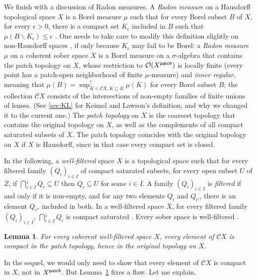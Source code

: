 \documentclass[preprint,12pt]{elsarticle}
\newcommand\diff{\smallsetminus}
\newcommand\Open{{\mathcal O}}
\newcommand\patch{{\text{\textsf{patch}}}}
\newcommand\dsup{\sup\nolimits^{\scriptstyle\uparrow}}
\newcommand\fcap{\bigcap\nolimits^{\scriptstyle\downarrow}}
\newtheorem{lemma}[theorem]{Lemma}
\begin{document}
We finish with a discussion of Radon measures.  A \emph{Radon measure}
on a Hausdorff topological space $X$ is a Borel measure $\mu$ such
that for every Borel subset $B$ of $X$, for every $\epsilon > 0$,
there is a compact set $K_\epsilon$ included in $B$ such that
$\mu (B \diff K_\epsilon) \leq \epsilon$
\cite[Definition~7.1.1]{Bogachev:mes:II}.  One needs to take care to
modify this definition slightly on non-Hausdorff spaces
\cite[Definition~7.2]{KL:measureext}, if only because $K_\epsilon$ may
fail to be Borel: a \emph{Radon measure} $\mu$ on a coherent sober
space $X$ is a Borel measure on a $\sigma$-algebra that contains the
patch topology on $X$, whose restriction to $\Open {(X^\patch)}$ is
locally finite (every point has a patch-open neighborhood of finite
$\mu$-measure) and \emph{inner regular}, meaning that
$\mu (B) = \dsup_{K \in \mathcal C X, K \subseteq B} \mu (K)$ for
every Borel subset $B$; the collection $\mathcal C X$ consists of the
intersections of non-empty families of finite unions of lenses.  (See
\ref{sec:KL} for Keimel and Lawson's definition, and why we changed it
to the current one.)
The \emph{patch topology} on $X$ is the coarsest topology that
contains the original topology on $X$, as well as the complements of
all compact saturated subsets of $X$.  The patch topology coincides
with the original topology on $X$ if $X$ is Hausdorff, since in that
case every compact set is closed.

In the following, a \emph{well-filtered} space $X$ is a topological
space such that for every filtered family ${(Q_i)}_{i \in I}$ of
compact saturated subsets, for every open subset $U$ of $Z$, if
$\fcap_{i \in I} Q_i \subseteq U$ then $Q_i \subseteq U$ for some
$i \in I$.  A family ${(Q_i)}_{i \in I}$ is \emph{filtered} if and
only if it is non-empty, and for any two elements $Q_i$ and $Q_{i'}$,
there is an element $Q_{i''}$ included in both.  In a well-filtered
space $X$, for every filtered family ${(Q_i)}_{i \in I}$,
$\fcap_{i \in I} Q_i$ is compact saturated
\cite[Proposition~8.3.6]{JGL-topology}.  Every sober space is
well-filtered \cite[Proposition 8.3.5]{JGL-topology}.  %
\begin{lemma}
  \label{lemma:lens:compact}
  For every coherent well-filtered space $X$, every element of
  $\mathcal C X$ is compact in the patch topology, hence in the
  original topology on $X$.
\end{lemma}
In the sequel, we would only need to show that every element of
$\mathcal C X$ is compact in $X$, not in $X^\patch$.  But
Lemma~\ref{lemma:lens:compact} fixes a flaw.  Let me explain.
\end{document}
